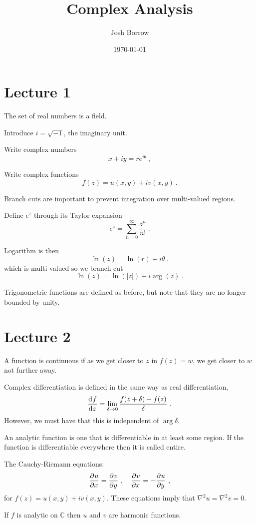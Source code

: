 \documentclass[11pt, a4paper]{Article}
\begin{document}
\title{Complex Analysis}
\author{Josh Borrow}
\date{\today}

\maketitle

\section{Lecture 1}

The set of real numbers is a field.

Introduce $i = \sqrt{-1}$, the imaginary unit.

Write complex numbers
$$
	x+iy = re^{i\theta}~,
$$

Write complex functions
$$
	f(z) = u(x,y) + iv(x,y)~.
$$

Branch cuts are important to prevent integration over multi-valued regions.

Define $e^z$ through its Taylor expansion
$$
	e^z = \sum_{n=0}^\infty \frac{z^n}{n!}~.
$$

Logarithm is then
$$
	\ln(z) = \ln(r) + i\theta~.
$$
which is multi-valued so we branch cut
$$
	\ln(z) = \ln(|z|) + i \arg(z)~.
$$

Trigonometric functions are defined as before, but note that they are no longer bounded by unity.

\section{Lecture 2}

A function is continuous if as we get closer to $z$ in $f(z)=w$, we get closer to $w$ not further away.

Complex differentiation is defined in the same way as real differentiation,
$$
	\frac{\mathrm{d}^{} {f}}{\mathrm{d} {z}^{}} = \lim_{\delta \rightarrow 0}\frac{f(z + \delta) - f(z)}{\delta}~.
$$
However, we must have that this is independent of $\arg{\delta}$.

An analytic function is one that is differentiable in at least some region.
If the function is differentiable everywhere then it is called entire.

The Cauchy-Riemann equations:
$$
	\frac{\partial^{} {u}}{\partial {x}^{}} = \frac{\partial^{} {v}}{\partial {y}^{}}~, ~~~\frac{\partial^{} {v}}{\partial {x}^{}} = -\frac{\partial^{} {u}}{\partial {y}^{}}~,
$$
for $f(z) = u(x,y) + iv(x,y)$. These equations imply that $\nabla^2 u = \nabla^2 v = 0$.

If $f$ is analytic on $\mathbb{C}$ then $u$ and $v$ are harmonic functions. 
\end{document}
